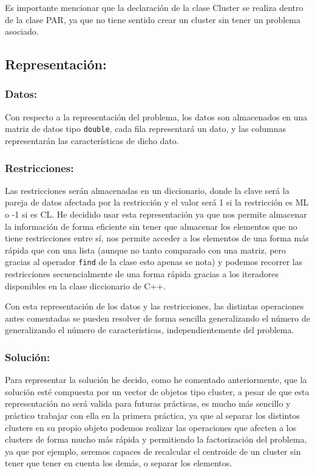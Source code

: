 \documentclass[12pt, spanish]{article}
\begin{document}
Es importante mencionar que la declaración de la clase Cluster se realiza dentro de la clase PAR, ya que no tiene sentido crear un cluster sin tener un problema asociado.


\newpage

\subsection{Representación:}

\subsubsection{Datos:}

Con respecto a la representación del problema, los datos son almacenados en una matriz de datos tipo \texttt{double}, cada fila representará un dato, y las columnas representarán las características de dicho dato.

\subsubsection{Restricciones:}

Las restricciones serán almacenadas en un diccionario, donde la clave será la pareja de datos afectada por la restricción y el valor será 1 si la restricción es ML o -1 si es CL. He decidido usar esta representación ya que nos permite almacenar la información de forma eficiente sin tener que almacenar los elementos que no tiene restricciones entre sí, nos permite acceder a los elementos de una forma más rápida que con una lista (aunque no tanto comparado con una matriz, pero gracias al operador \texttt{find} de la clase esto apenas se nota) y podemos recorrer las restricciones secuencialmente de una forma rápida gracias a los iteradores disponibles en la clase diccionario de C++.


Con esta representación de los datos y las restricciones, las distintas operaciones antes comentadas se pueden resolver de forma sencilla generalizando el número de generalizando el número de características, independientemente del problema.


\subsubsection{Solución:}

Para representar la solución he decido, como he comentado anteriormente, que la solución esté compuesta por un vector de objetos tipo cluster, a pesar de que esta representación no será valida para futuras prácticas, es mucho más sencillo y práctico trabajar con ella en la primera práctica, ya que al separar los distintos clusters en su propio objeto podemos realizar las operaciones que afecten a los clusters de forma mucho más rápida y permitiendo la factorización del problema, ya que por ejemplo, seremos capaces de recalcular el centroide de un cluster sin tener que tener en cuenta los demás, o separar los elementos.
\end{document}
